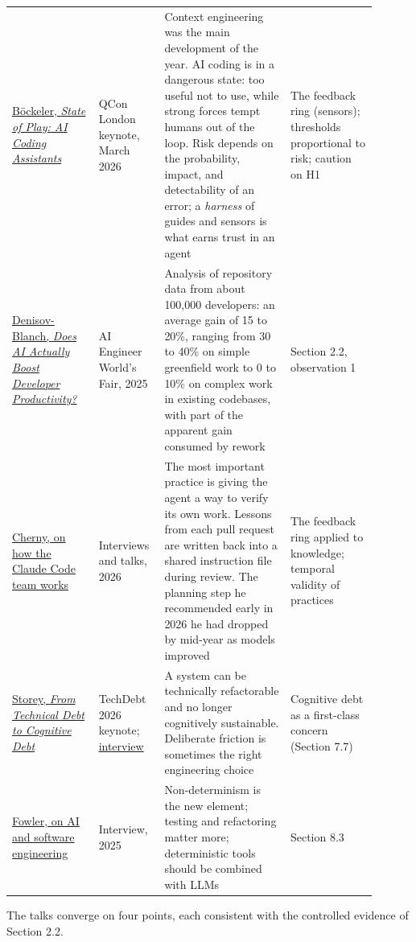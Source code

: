 \documentclass[11pt]{article}
\begin{document}
\begin{longtable}{p{0.22\linewidth}p{0.14\linewidth}p{0.32\linewidth}p{0.22\linewidth}}
\href{https://infoq.com/news/2026/03/ai-coding-state}{B\"ockeler, \emph{State of Play: AI Coding Assistants}} & QCon London keynote, March 2026 & Context engineering was the main development of the year. AI coding is in a dangerous state: too useful not to use, while strong forces tempt humans out of the loop. Risk depends on the probability, impact, and detectability of an error; a \emph{harness} of guides and sensors is what earns trust in an agent & The feedback ring (sensors); thresholds proportional to risk; caution on H1 \\
\href{https://ai.engineer/talks/tbDDYKRFjhk-ai-developer-productivity}{Denisov-Blanch, \emph{Does AI Actually Boost Developer Productivity?}} & AI Engineer World's Fair, 2025 & Analysis of repository data from about 100,000 developers: an average gain of 15 to 20\%, ranging from 30 to 40\% on simple greenfield work to 0 to 10\% on complex work in existing codebases, with part of the apparent gain consumed by rework & Section 2.2, observation 1 \\
\href{https://infoq.com/news/2026/01/claude-code-creator-workflow/}{Cherny, on how the Claude Code team works} & Interviews and talks, 2026 & The most important practice is giving the agent a way to verify its own work. Lessons from each pull request are written back into a shared instruction file during review. The planning step he recommended early in 2026 he had dropped by mid-year as models improved & The feedback ring applied to knowledge; temporal validity of practices \\
\href{https://conf.researchr.org/details/TechDebt-2026/TechDebt-2026-techdebt-program/3/From-Technical-Debt-to-Cognitive-Debt}{Storey, \emph{From Technical Debt to Cognitive Debt}} & TechDebt 2026 keynote; \href{https://techleadjournal.dev/episodes/264/}{interview} & A system can be technically refactorable and no longer cognitively sustainable. Deliberate friction is sometimes the right engineering choice & Cognitive debt as a first-class concern (Section 7.7) \\
\href{https://newsletter.pragmaticengineer.com/p/martin-fowler}{Fowler, on AI and software engineering} & Interview, 2025 & Non-determinism is the new element; testing and refactoring matter more; deterministic tools should be combined with LLMs & Section 8.3 \\
\bottomrule
\end{longtable}
\normalsize

The talks converge on four points, each consistent with the controlled evidence of Section 2.2.
\end{document}

